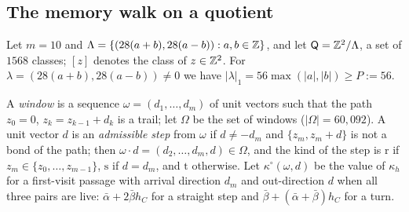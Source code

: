 \subsection{The memory walk on a quotient}\label{s:memwalk}

Let $m = 10$ and $\Lambda = \{ (28(a + b), 28(a - b)) : a, b \in \mathbb{Z} \}$, and let $\mathsf Q = \mathbb{Z}^2/\Lambda$, a set of $1568$ classes; $[z]$ denotes the class of $z \in \mathbb{Z}^2$. For $\lambda = (28(a + b), 28(a - b)) \neq 0$ we have $|\lambda|_1 = 56 \max(|a|, |b|) \ge P := 56$.

A \emph{window} is a sequence $\omega = (d_1, \dots, d_m)$ of unit vectors such that the path $z_0 = 0$, $z_k = z_{k - 1} + d_k$ is a trail; let $\Omega$ be the set of windows ($|\Omega| = 60{,}092$). A unit vector $d$ is an \emph{admissible step} from $\omega$ if $d \neq -d_m$ and $\{z_m, z_m + d\}$ is not a bond of the path; then $\omega \cdot d = (d_2, \dots, d_m, d) \in \Omega$, and the kind of the step is $\mathrm r$ if $z_m \in \{z_0, \dots, z_{m - 1}\}$, $\mathrm s$ if $d = d_m$, and $\mathrm t$ otherwise. Let $\kappa^\circ(\omega, d)$ be the value of $\kappa_h$ for a first-visit passage with arrival direction $d_m$ and out-direction $d$ when all three pairs are live: $\bar\alpha + 2 \bar\beta h_C$ for a straight step and $\bar\beta + (\bar\alpha + \bar\beta) h_C$ for a turn.

